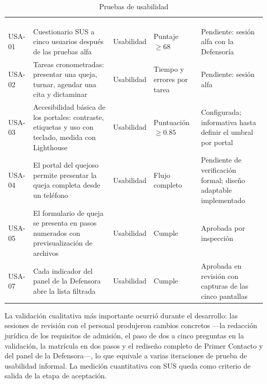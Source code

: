	\small
	\renewcommand{\arraystretch}{1.2}
	\setlength{\tabcolsep}{4pt}
	\begin{longtable}{|p{1.2cm}|L{5.6cm}|L{2.2cm}|L{2.6cm}|L{2.9cm}|}
		\hiderowcolors\caption{Pruebas de usabilidad}
		\label{tab:pruebas_usabilidad} \\ \showrowcolors
		\hline
		 &  &  &
		 &  \\
		\hline
		\endfirsthead
		\hline
		 &  &  &
		 &  \\
		\hline
		\endhead
		USA-01 & Cuestionario SUS a cinco usuarios después de las pruebas alfa \cite{brooke_sus} & Usabilidad &
		Puntaje $\geq 68$ & Pendiente: sesión alfa con la Defensoría \\ \hline
		USA-02 & Tareas cronometradas: presentar una queja, turnar, agendar una cita y dictaminar & Usabilidad & Tiempo y errores por tarea & Pendiente: sesión alfa \\ \hline
		USA-03 & Accesibilidad básica de los portales: contraste, etiquetas y uso con teclado, medida con
		Lighthouse & Usabilidad & Puntuación $\geq 0.85$ & Configurada; informativa hasta definir el umbral
		por portal \\ \hline
		USA-04 & El portal del quejoso permite presentar la queja completa desde un teléfono & Usabilidad &
		Flujo completo & Pendiente de verificación formal; diseño adaptable implementado \\ \hline
		USA-05 & El formulario de queja se presenta en pasos numerados con previsualización de archivos &
		Usabilidad & Cumple & Aprobada por inspección \\ \hline
		USA-07 & Cada indicador del panel de la Defensora abre la lista filtrada & Usabilidad & Cumple &
		Aprobada en revisión con capturas de las cinco pantallas \\ \hline
	\end{longtable}
	\normalsize

	La validación cualitativa más importante ocurrió durante el desarrollo: las sesiones de revisión con
	el personal produjeron cambios concretos ---la redacción jurídica de los requisitos de admisión, el
	paso de dos a cinco preguntas en la validación, la matrícula en dos pasos y el rediseño completo de
	Primer Contacto y del panel de la Defensora---, lo que equivale a varias iteraciones de prueba de
	usabilidad informal. La medición cuantitativa con SUS queda como criterio de salida de la etapa de
	aceptación.

